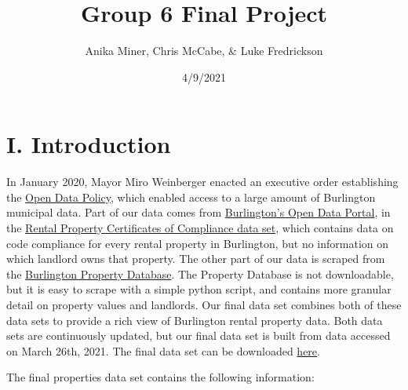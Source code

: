 \documentclass[
]{article}
\title{Group 6 Final Project}
\author{Anika Miner, Chris McCabe, \& Luke Fredrickson}
\date{4/9/2021}
\begin{document}
\maketitle

\hypertarget{i.-introduction}{%
\section{I. Introduction}\label{i.-introduction}}

In January 2020, Mayor Miro Weinberger enacted an executive order
establishing the \href{https://www.burlingtonvt.gov/it/open-data}{Open
Data Policy}, which enabled access to a large amount of Burlington
municipal data. Part of our data comes from
\href{https://data.burlingtonvt.gov/pages/home/}{Burlington's Open Data
Portal}, in the
\href{https://data.burlingtonvt.gov/explore/dataset/rental-property-certificate-of-compliance/information/}{Rental
Property Certificates of Compliance data set}, which contains data on
code compliance for every rental property in Burlington, but no
information on which landlord owns that property. The other part of our
data is scraped from the
\href{https://property.burlingtonvt.gov/}{Burlington Property Database}.
The Property Database is not downloadable, but it is easy to scrape with
a simple python script, and contains more granular detail on property
values and landlords. Our final data set combines both of these data
sets to provide a rich view of Burlington rental property data. Both
data sets are continuously updated, but our final data set is built from
data accessed on March 26th, 2021. The final data set can be downloaded
\href{https://github.com/lukefredrickson/STAT187-Final-Project/blob/master/properties.csv}{here}.

The final properties data set contains the following information:
\end{document}
